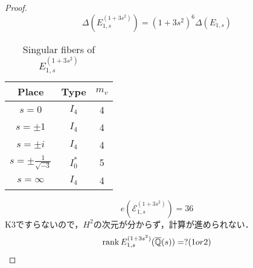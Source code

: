 \documentclass[main]{subfiles}
\begin{document}
\begin{proof}
    \begin{equation}
        \Delta(E_{1,s}^{(1 + 3s^{2})}) = (1 + 3s^{2})^{6} \Delta(E_{1,s})
    \end{equation}
    \begin{table}[h]
        \centering
        \caption{Singular fibers of $E_{1,s}^{(1 + 3s^{2})}$}
        \begin{tabular}{|c|c|c|}
            \hline
            Place                        & Type    & $m_v$ \\
            \hline
            $s=0$                        & $I_4$   & 4     \\
            $s=\pm 1$                    & $I_4$   & 4     \\
            $s=\pm i$                    & $I_4$   & 4     \\
            $s=\pm \frac{1}{\sqrt{-3}} $ & $I_0^*$ & 5     \\
            $s=\infty$                   & $I_4$   & 4     \\
            \hline
        \end{tabular}
    \end{table}
    \begin{equation}
        e(\mathcal{E}_{1,s}^{(1 + 3s^{2})}) = 36
    \end{equation}
    K3ですらないので，$H^2$の次元が分からず，計算が進められない．
    \begin{equation}
        \operatorname{rank} E_{1,s}^{(1 + 3s^{2})}(\overline{\mathbb{Q}}(s)) = ? (1 or 2)
    \end{equation}
\end{proof}
\end{document}
